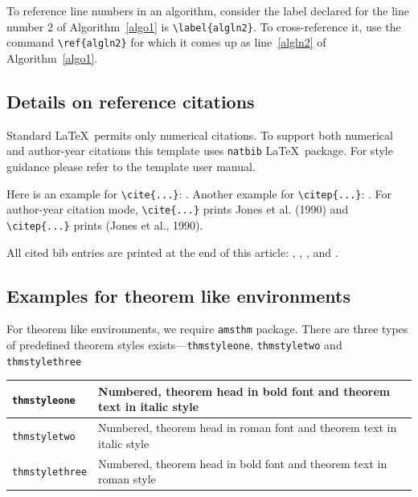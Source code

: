 \documentclass{article}
\begin{document}
To reference line numbers in an algorithm, consider the label declared for the line number 2 of Algorithm~\ref{algo1} is \verb+\label{algln2}+. To cross-reference it, use the command \verb+\ref{algln2}+ for which it comes up as line~\ref{algln2} of Algorithm~\ref{algo1}.

\subsection{Details on reference citations}\label{subsec7}

Standard \LaTeX\ permits only numerical citations. To support both numerical and author-year citations this template uses \verb+natbib+ \LaTeX\ package. For style guidance please refer to the template user manual.

Here is an example for \verb+\cite{...}+: \cite{bib1}. Another example for \verb+\citep{...}+: \citep{bib2}. For author-year citation mode, \verb+\cite{...}+ prints Jones et al. (1990) and \verb+\citep{...}+ prints (Jones et al., 1990).

All cited bib entries are printed at the end of this article: \cite{bib3}, \cite{bib4}, \cite{bib5}, \cite{bib6} and \cite{bib7}.

\subsection{Examples for theorem like environments}\label{sec10}

For theorem like environments, we require \verb+amsthm+ package. There are three types of predefined theorem styles exists---\verb+thmstyleone+, \verb+thmstyletwo+ and \verb+thmstylethree+ 

\bigskip
\begin{tabular}{|l|p{19pc}|}
\hline
\verb+thmstyleone+ & Numbered, theorem head in bold font and theorem text in italic style \\\hline
\verb+thmstyletwo+ & Numbered, theorem head in roman font and theorem text in italic style \\\hline
\verb+thmstylethree+ & Numbered, theorem head in bold font and theorem text in roman style \\\hline
\end{tabular}
\bigskip
\end{document}
